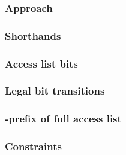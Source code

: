 \subsubsection{Approach                            } \label{rlp txn v2: phase constraints: access list: approach}              
\subsubsection{Shorthands                          } \label{rlp txn v2: phase constraints: access list: shorthands}            
\subsubsection{Access list bits                    } \label{rlp txn v2: phase constraints: access list: access list bits}      
\subsubsection{Legal bit transitions               } \label{rlp txn v2: phase constraints: access list: legal transitions}     
\subsubsection{\rlp{}-prefix of full access list   } \label{rlp txn v2: phase constraints: access list: access list prefix}    
\subsubsection{Constraints                         } \label{rlp txn v2: phase constraints: access list: constraints}           
